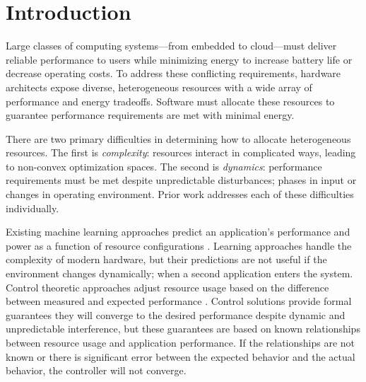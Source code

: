 \section{Introduction}
Large classes of computing systems---from embedded to cloud---must
deliver reliable performance to users while minimizing energy to
increase battery life or decrease operating costs.  To address these
conflicting requirements, hardware architects expose diverse,
heterogeneous resources with a wide array of performance and energy
tradeoffs.  Software must allocate these resources to
guarantee performance requirements are met with minimal energy.


There are two primary difficulties in determining how to allocate
heterogeneous resources.  The first is \emph{complexity}: resources
interact in complicated ways, leading to non-convex optimization
spaces.  The second is \emph{dynamics}: perfor\-mance requirements
must be met despite unpredictable disturbances; \eg{} phases in input
or changes in operating environment.  Prior work addresses each of
these difficulties individually.

Existing machine learning approaches predict an application's
performance and power as a function of resource configurations
\cite{reddiHPCA2013,dubach2010,Bitirgen2008,Ipek,Koala,LEO,Flicker,Ponamarev,Paragon}.
Learning approaches handle the complexity of modern hardware, but
their predictions are not useful if the environment changes
dynamically; \eg{} when a second application enters the system.
Control theoretic approaches adjust resource usage based on the
difference between measured and expected performance
\cite{Hellerstein2004a,Chen2011,POET,ControlWare,Agilos,grace2,JouleGuard}.
Control solutions provide formal guarantees they will converge to the
desired performance despite dynamic and unpredictable interference,
but these guarantees are based on known relationships between resource
usage and application performance.  If the relationships are not known
or there is significant error between the expected behavior and the
actual behavior, the controller will not converge.

